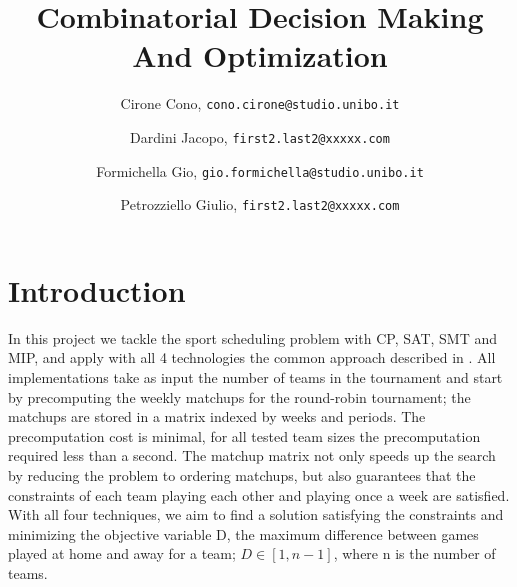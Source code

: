 \documentclass{article}
\title{Combinatorial Decision Making And Optimization}
\author{
  Cirone Cono, \texttt{cono.cirone@studio.unibo.it}
  \and
  Dardini Jacopo, \texttt{first2.last2@xxxxx.com}
  \and
  Formichella Gio, \texttt{gio.formichella@studio.unibo.it}
  \and
  Petrozziello Giulio, \texttt{first2.last2@xxxxx.com}
}
\date{}
\begin{document}
\maketitle

\section{Introduction}
In this project we tackle the sport scheduling problem with CP, SAT, SMT and MIP, and apply with all 4 technologies the common approach described in \cite{10.1007/10704567_6}. All implementations take as input the number of teams in the tournament and start by precomputing the weekly matchups for the round-robin tournament; the matchups are stored in a matrix indexed by weeks and periods. The precomputation cost is minimal, for all tested team sizes the precomputation required less than a second. The matchup matrix not only speeds up the search by reducing the problem to ordering matchups, but also guarantees that the constraints of each team playing each other and playing once a week are satisfied. With all four techniques, we aim to find a solution satisfying the constraints and minimizing the objective variable D, the maximum difference between games played at home and away for a team; $D\in [1, n-1]$, where n is the number of teams. 











\end{document}
